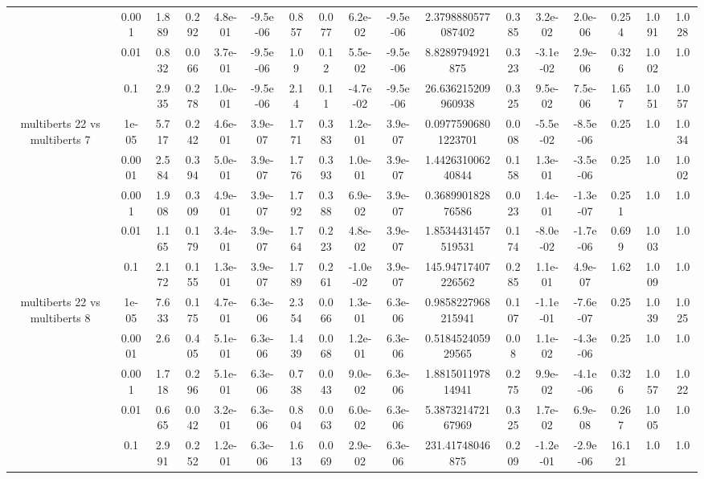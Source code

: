 \begin{tabular}{|c|c|c|c|c|c|c|c|c|c|c|c|c|c|c|c|c|}
 & 0.001 & 1.889 & 0.292 & 4.8e-01 & -9.5e-06 & 0.857 & 0.077 & 6.2e-02 & -9.5e-06 & 2.3798880577087402 & 0.385 & 3.2e-02 & 2.0e-06 & 0.254 & 1.091 & 1.028 \\
 & 0.01 & 0.832 & 0.066 & 3.7e-01 & -9.5e-06 & 1.09 & 0.12 & 5.5e-02 & -9.5e-06 & 8.8289794921875 & 0.323 & -3.1e-02 & 2.9e-06 & 0.326 & 1.002 & 1.0 \\
 & 0.1 & 2.935 & 0.278 & 1.0e-01 & -9.5e-06 & 2.14 & 0.11 & -4.7e-02 & -9.5e-06 & 26.636215209960938 & 0.325 & 9.5e-02 & 7.5e-06 & 1.657 & 1.051 & 1.057 \\
\hline
\multirow{5}{*}{multiberts 22 vs multiberts 7} & 1e-05 & 5.717 & 0.242 & 4.6e-01 & 3.9e-07 & 1.771 & 0.383 & 1.2e-01 & 3.9e-07 & 0.09775906801223701 & 0.008 & -5.5e-02 & -8.5e-06 & 0.25 & 1.0 & 1.034 \\
 & 0.0001 & 2.584 & 0.394 & 5.0e-01 & 3.9e-07 & 1.776 & 0.393 & 1.0e-01 & 3.9e-07 & 1.442631006240844 & 0.158 & 1.3e-01 & -3.5e-06 & 0.25 & 1.0 & 1.002 \\
 & 0.001 & 1.908 & 0.309 & 4.9e-01 & 3.9e-07 & 1.792 & 0.388 & 6.9e-02 & 3.9e-07 & 0.368990182876586 & 0.023 & 1.4e-01 & -1.3e-07 & 0.251 & 1.0 & 1.0 \\
 & 0.01 & 1.165 & 0.179 & 3.4e-01 & 3.9e-07 & 1.764 & 0.223 & 4.8e-02 & 3.9e-07 & 1.8534431457519531 & 0.174 & -8.0e-02 & -1.7e-06 & 0.699 & 1.003 & 1.0 \\
 & 0.1 & 2.172 & 0.155 & 1.3e-01 & 3.9e-07 & 1.789 & 0.261 & -1.0e-02 & 3.9e-07 & 145.94717407226562 & 0.285 & 1.1e-01 & 4.9e-07 & 1.62 & 1.009 & 1.0 \\
\hline
\multirow{5}{*}{multiberts 22 vs multiberts 8} & 1e-05 & 7.633 & 0.175 & 4.7e-01 & 6.3e-06 & 2.354 & 0.066 & 1.3e-01 & 6.3e-06 & 0.9858227968215941 & 0.107 & -1.1e-01 & -7.6e-07 & 0.25 & 1.039 & 1.025 \\
 & 0.0001 & 2.6 & 0.405 & 5.1e-01 & 6.3e-06 & 1.439 & 0.068 & 1.2e-01 & 6.3e-06 & 0.518452405929565 & 0.08 & 1.1e-02 & -4.3e-06 & 0.25 & 1.0 & 1.0 \\
 & 0.001 & 1.718 & 0.296 & 5.1e-01 & 6.3e-06 & 0.738 & 0.043 & 9.0e-02 & 6.3e-06 & 1.881501197814941 & 0.275 & 9.9e-02 & -4.1e-06 & 0.326 & 1.057 & 1.022 \\
 & 0.01 & 0.665 & 0.042 & 3.2e-01 & 6.3e-06 & 0.804 & 0.063 & 6.0e-02 & 6.3e-06 & 5.387321472167969 & 0.325 & 1.7e-02 & 6.9e-08 & 0.267 & 1.005 & 1.0 \\
 & 0.1 & 2.991 & 0.252 & 1.2e-01 & 6.3e-06 & 1.613 & 0.069 & 2.9e-02 & 6.3e-06 & 231.41748046875 & 0.209 & -1.2e-01 & -2.9e-06 & 16.121 & 1.0 & 1.0 \\

\end{tabular}
